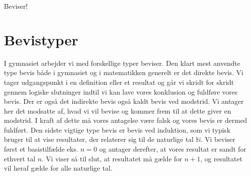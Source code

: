 \begin{center}
\Huge
Beviser!
\end{center}
\section*{Bevistyper}

I gymnasiet arbejder vi med forskellige typer beviser. Den klart mest anvendte type bevis både i gymnasiet og i matematikken generelt er det direkte bevis. Vi tager udgangspunkt i en definition eller et resultat og går vi skridt for skridt gennem logiske slutninger indtil vi kan lave vores konklusion og fuldføre vores bevis. Der er også det indirekte bevis også kaldt bevis ved modstrid. Vi antager her det modsatte af, hvad vi vil bevise og kommer frem til at dette giver en modstrid. I kraft af dette må vores antagelse være falsk og vores bevis er dermed fuldført. Den sidste vigtige type bevis er bevis ved induktion, som vi typisk bruger til at vise resultater, der relaterer sig til de naturlige tal $\mathbb{N}$. Vi beviser først et basistilfælde eks. $n = 0$ og antager derefter, at vores resultat er sandt for ethvert tal $n$. Vi viser så til slut, at resultatet må gælde for $n+1$, og resultatet vil heraf gælde for alle naturlige tal.

